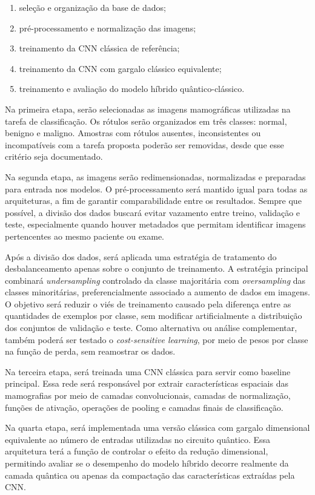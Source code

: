 \documentclass[
    12pt,
    openright,
    oneside,
    a4paper,
    english,
    brazil
]{abntex2}
\begin{document}
\begin{enumerate}
    \item seleção e organização da base de dados;
    \item pré-processamento e normalização das imagens;
    \item treinamento da CNN clássica de referência;
    \item treinamento da CNN com gargalo clássico equivalente;
    \item treinamento e avaliação do modelo híbrido quântico-clássico.
\end{enumerate}

Na primeira etapa, serão selecionadas as imagens mamográficas utilizadas na tarefa de classificação. Os rótulos serão organizados em três classes: normal, benigno e maligno. Amostras com rótulos ausentes, inconsistentes ou incompatíveis com a tarefa proposta poderão ser removidas, desde que esse critério seja documentado.

Na segunda etapa, as imagens serão redimensionadas, normalizadas e preparadas para entrada nos modelos. O pré-processamento será mantido igual para todas as arquiteturas, a fim de garantir comparabilidade entre os resultados. Sempre que possível, a divisão dos dados buscará evitar vazamento entre treino, validação e teste, especialmente quando houver metadados que permitam identificar imagens pertencentes ao mesmo paciente ou exame.

Após a divisão dos dados, será aplicada uma estratégia de tratamento do desbalanceamento apenas sobre o conjunto de treinamento. A estratégia principal combinará \textit{undersampling} controlado da classe majoritária com \textit{oversampling} das classes minoritárias, preferencialmente associado a aumento de dados em imagens. O objetivo será reduzir o viés de treinamento causado pela diferença entre as quantidades de exemplos por classe, sem modificar artificialmente a distribuição dos conjuntos de validação e teste. Como alternativa ou análise complementar, também poderá ser testado o \textit{cost-sensitive learning}, por meio de pesos por classe na função de perda, sem reamostrar os dados.

Na terceira etapa, será treinada uma CNN clássica para servir como baseline principal. Essa rede será responsável por extrair características espaciais das mamografias por meio de camadas convolucionais, camadas de normalização, funções de ativação, operações de pooling e camadas finais de classificação.

Na quarta etapa, será implementada uma versão clássica com gargalo dimensional equivalente ao número de entradas utilizadas no circuito quântico. Essa arquitetura terá a função de controlar o efeito da redução dimensional, permitindo avaliar se o desempenho do modelo híbrido decorre realmente da camada quântica ou apenas da compactação das características extraídas pela CNN.
\end{document}
